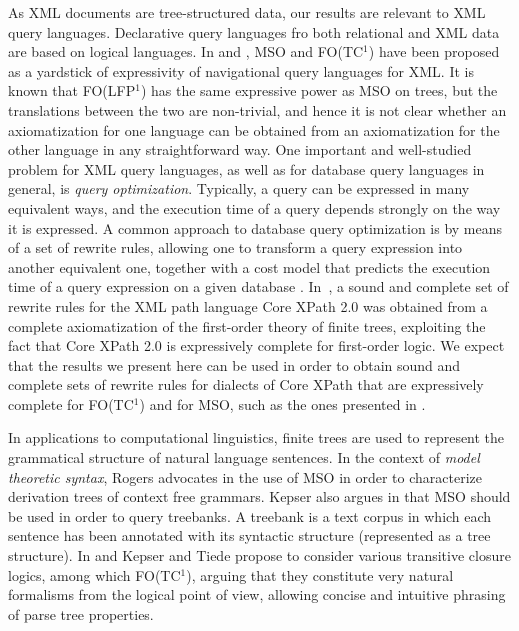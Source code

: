 \documentclass{LMCS}
\newcommand{\xml}{\textsf{XML}\xspace}
\newcommand{\mso}{\textsf{MSO}\xspace}
\newcommand{\fotc}{\textsf{FO(TC$^1$)}\xspace}
\newcommand{\folfp}{\textsf{FO(LFP$^1$)}\xspace}
\begin{document}
As \xml documents are tree-structured data, our results are
relevant to \xml query languages. Declarative query languages fro both relational and \xml data are
based on logical languages. In \cite{1376952} and \cite{GottlobKoch},
\mso and \fotc have been proposed as a yardstick of expressivity
of navigational query languages for \xml. It is known that \folfp has the same
expressive power as \mso on trees, but the translations between
the two are non-trivial, and hence it is not clear whether an
axiomatization for one language can be obtained from an
axiomatization for the other language in any straightforward way.
One important and well-studied problem for XML query languages, as well as for
database query languages in general,  is
\emph{query optimization}. Typically, a query can be expressed in many
equivalent ways, and the execution time of a query depends strongly on
the way it is expressed. A common approach to database query optimization is
by means of a set of rewrite rules, allowing one to
transform a query expression into another equivalent one, together with
a cost model that predicts the execution time of a query expression on
a given database \cite{DBLP:books/aw/AbiteboulHV95}.
 In~\cite{CateMarxXPath20}, a sound and complete set of
rewrite rules for the XML path language Core XPath 2.0 was obtained
from a complete axiomatization of the first-order theory of finite trees,
exploiting the fact that Core XPath 2.0 is expressively complete for
first-order logic. We expect that the results we present here can be
used in order to obtain sound and complete sets of rewrite rules for
dialects of Core XPath that are expressively complete for \fotc and for
\mso, such as the ones presented in \cite{TenCate2006,1376952}.

In applications to computational linguistics, finite trees are
used to represent the grammatical structure of natural language
sentences. In the context of \emph{model theoretic syntax}, Rogers
advocates in \cite{521965} the use of \mso in order to
characterize derivation trees of context free grammars. Kepser
also argues in \cite{1047003} that \mso should be used
in order to query treebanks. A treebank is a text corpus in which
each sentence has been annotated with its syntactic structure
(represented as a tree structure). In \cite{2006} and \cite{1219706} Kepser and
Tiede propose to consider various transitive closure logics,
among which \fotc, arguing that they constitute very natural
formalisms from the logical point of view, allowing concise and intuitive phrasing of parse tree properties.\\
\end{document}
